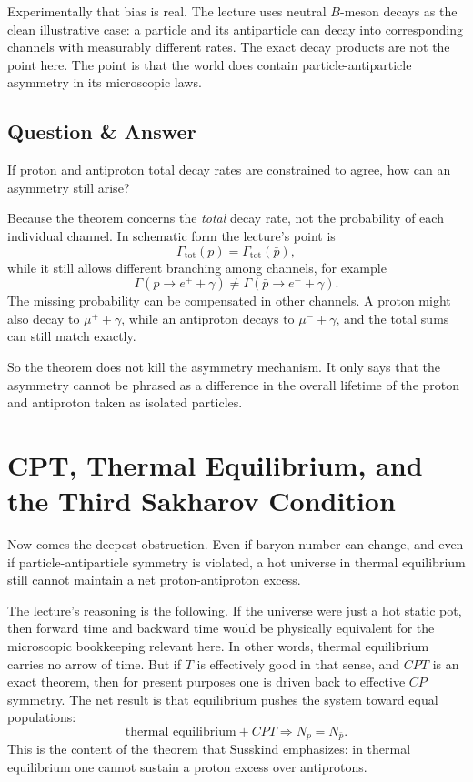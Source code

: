 Experimentally that bias is real. The lecture uses neutral \(B\)-meson decays as the clean illustrative case: a particle and its antiparticle can decay into corresponding channels with measurably different rates. The exact decay products are not the point here. The point is that the world does contain particle-antiparticle asymmetry in its microscopic laws.

\subsection{Question \& Answer}

If proton and antiproton total decay rates are constrained to agree, how can an asymmetry still arise?

Because the theorem concerns the \emph{total} decay rate, not the probability of each individual channel. In schematic form the lecture's point is
\begin{equation}
\Gamma_{\mathrm{tot}}(p)=\Gamma_{\mathrm{tot}}(\bar p),
\end{equation}
while it still allows different branching among channels, for example
\begin{equation}
\Gamma(p\to e^+ + \gamma)\neq \Gamma(\bar p\to e^- + \gamma).
\end{equation}
The missing probability can be compensated in other channels. A proton might also decay to \(\mu^+ + \gamma\), while an antiproton decays to \(\mu^- + \gamma\), and the total sums can still match exactly.

So the theorem does not kill the asymmetry mechanism. It only says that the asymmetry cannot be phrased as a difference in the overall lifetime of the proton and antiproton taken as isolated particles.

\section{CPT, Thermal Equilibrium, and the Third Sakharov Condition}

Now comes the deepest obstruction. Even if baryon number can change, and even if particle-antiparticle symmetry is violated, a hot universe in thermal equilibrium still cannot maintain a net proton-antiproton excess.

The lecture's reasoning is the following. If the universe were just a hot static pot, then forward time and backward time would be physically equivalent for the microscopic bookkeeping relevant here. In other words, thermal equilibrium carries no arrow of time. But if \(T\) is effectively good in that sense, and \(CPT\) is an exact theorem, then for present purposes one is driven back to effective \(CP\) symmetry. The net result is that equilibrium pushes the system toward equal populations:
\begin{equation}
\text{thermal equilibrium} + CPT \Longrightarrow N_p=N_{\bar p}.
\end{equation}
This is the content of the theorem that Susskind emphasizes: in thermal equilibrium one cannot sustain a proton excess over antiprotons.

